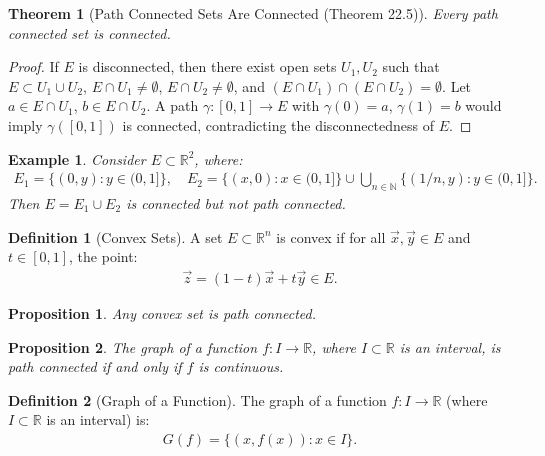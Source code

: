 \documentclass[7pt]{article}
\theoremstyle{definition}
\newtheorem{definition}{Definition}
\theoremstyle{plain}
\newtheorem{theorem}{Theorem}
\newtheorem{proposition}{Proposition}
\newtheorem{example}{Example}
\begin{document}
\begin{theorem}[Path Connected Sets Are Connected (Theorem 22.5)]
Every path connected set is connected.
\end{theorem}

\begin{proof}
If $ E $ is disconnected, then there exist open sets $ U_1, U_2 $ such that $ E \subset U_1 \cup U_2 $, $ E \cap U_1 \neq \emptyset $, $ E \cap U_2 \neq \emptyset $, and $ (E \cap U_1) \cap (E \cap U_2) = \emptyset $. Let $ a \in E \cap U_1 $, $ b \in E \cap U_2 $. A path $ \gamma : [0, 1] \to E $ with $ \gamma(0) = a $, $ \gamma(1) = b $ would imply $ \gamma([0, 1]) $ is connected, contradicting the disconnectedness of $ E $.
\end{proof}

\begin{example}
Consider $ E \subset \mathbb{R}^2 $, where:
\begin{align}
E_1 = \{(0, y) : y \in (0, 1]\}, \quad
E_2 = \{(x, 0) : x \in (0, 1]\} \cup \bigcup_{n \in \mathbb{N}} \{(1/n, y) : y \in (0, 1]\}.
\end{align}
Then $ E = E_1 \cup E_2 $ is connected but not path connected.
\end{example}

\begin{definition}[Convex Sets]
A set $ E \subset \mathbb{R}^n $ is convex if for all $ \vec{x}, \vec{y} \in E $ and $ t \in [0, 1] $, the point:
\begin{align}
\vec{z} = (1-t)\vec{x} + t\vec{y} \in E.
\end{align}
\end{definition}

\begin{proposition}
Any convex set is path connected.
\end{proposition}

\begin{proposition}
The graph of a function $ f : I \to \mathbb{R} $, where $ I \subset \mathbb{R} $ is an interval, is path connected if and only if $ f $ is continuous.
\end{proposition}

\begin{definition}[Graph of a Function]
The graph of a function $ f : I \to \mathbb{R} $ (where $ I \subset \mathbb{R} $ is an interval) is:
\begin{align}
G(f) = \{(x, f(x)) : x \in I\}.
\end{align}
\end{definition}
\end{document}
